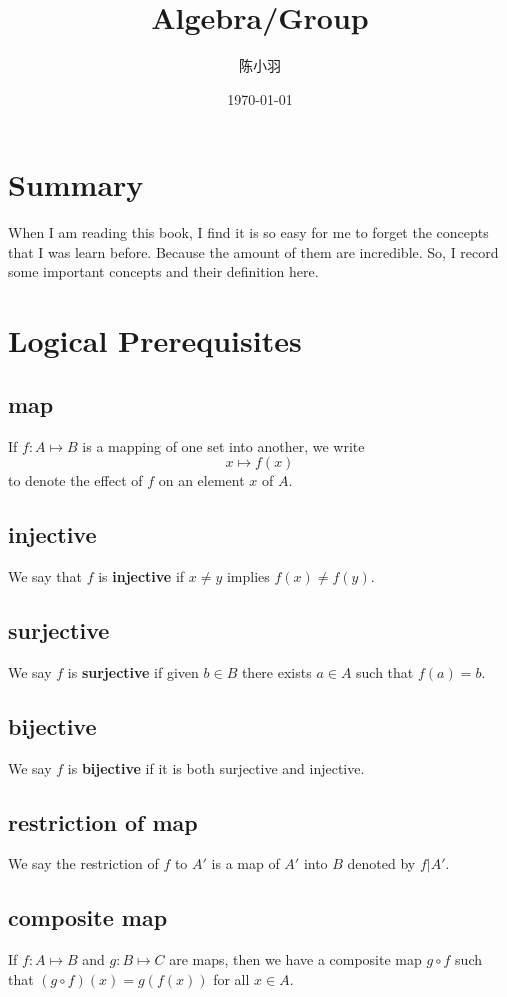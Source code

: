 \documentclass[11pt]{article}
\author{陈小羽}
\date{\today}
\title{Algebra/Group}
\begin{document}
\maketitle
\tableofcontents

\section{Summary}
\label{sec:orgac572bd}
When I am reading this book, I find it is so easy for me to forget the concepts
that I was learn before. Because the amount of them are incredible.
So, I record some important concepts and their definition here.

\section{Logical Prerequisites}
\label{sec:org8970e84}
\subsection{map}
\label{sec:org0d10647}
If \(f: A\mapsto B\) is a mapping of one set into another, we write
\[x \mapsto f(x)\] to denote the effect of \(f\) on an element \(x\) of \(A\).
\subsection{injective}
\label{sec:orgb7d02a2}
We say that \(f\) is \textbf{injective} if \(x\not=y\) implies \(f(x)\not=f(y)\).
\subsection{surjective}
\label{sec:orgee86f6c}
We say \(f\) is \textbf{surjective} if given \(b\in B\) there exists \(a\in A\) such that \(f(a) = b\).
\subsection{bijective}
\label{sec:orgf578fa6}
We say \(f\) is \textbf{bijective} if it is both surjective and injective.
\subsection{restriction of map}
\label{sec:org72c85fb}
We say the restriction of \(f\) to \(A'\) is a map of \(A'\) into \(B\) denoted by \(f|A'\).
\subsection{composite map}
\label{sec:orge085e03}
If \(f: A\mapsto B\) and \(g: B\mapsto C\) are maps, then we have a composite map \(g\circ f\)
such that \((g\circ f)(x) = g(f(x))\) for all \(x\in A\).
\end{document}
